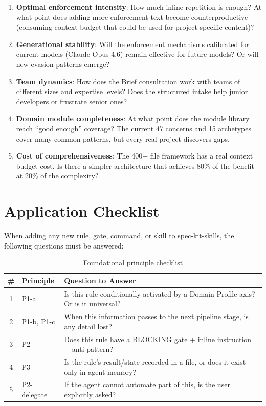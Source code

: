 \documentclass[11pt,a4paper,openright,twoside]{report}
\begin{document}
\begin{enumerate}
  \item \textbf{Optimal enforcement intensity}: How much inline repetition is enough? At what point does adding more enforcement text become counterproductive (consuming context budget that could be used for project-specific content)?
  \item \textbf{Generational stability}: Will the enforcement mechanisms calibrated for current models (Claude Opus 4.6) remain effective for future models? Or will new evasion patterns emerge?
  \item \textbf{Team dynamics}: How does the Brief consultation work with teams of different sizes and expertise levels? Does the structured intake help junior developers or frustrate senior ones?
  \item \textbf{Domain module completeness}: At what point does the module library reach ``good enough'' coverage? The current 47 concerns and 15 archetypes cover many common patterns, but every real project discovers gaps.
  \item \textbf{Cost of comprehensiveness}: The 400+ file framework has a real context budget cost. Is there a simpler architecture that achieves 80\% of the benefit at 20\% of the complexity?
\end{enumerate}


\section{Application Checklist}

When adding any new rule, gate, command, or skill to spec-kit-skills, the following questions must be answered:

\begin{table}[H]
\centering
\caption{Foundational principle checklist}
\label{tab:principle-checklist}
\begin{tabularx}{\textwidth}{clX}
\toprule
\textbf{\#} & \textbf{Principle} & \textbf{Question to Answer} \\
\midrule
1 & P1-a & Is this rule conditionally activated by a Domain Profile axis? Or is it universal? \\
2 & P1-b, P1-c & When this information passes to the next pipeline stage, is any detail lost? \\
3 & P2 & Does this rule have a BLOCKING gate + inline instruction + anti-pattern? \\
4 & P3 & Is the rule's result/state recorded in a file, or does it exist only in agent memory? \\
5 & P2-delegate & If the agent cannot automate part of this, is the user explicitly asked? \\
\bottomrule
\end{tabularx}
\end{table}
\end{document}
